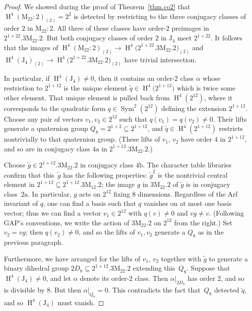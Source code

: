 \documentclass[pdftex]{sigma}
\numberwithin{equation}{section}
\newcommand\ra{\mathrm a}
\newcommand\rb{\mathrm b}
\newcommand\rJ{\mathrm J}
\newcommand\rM{\mathrm M}
\DeclareMathOperator\homology{H}
\renewcommand\H{\homology}
\newcommand\<\langle
\renewcommand\>\rangle
\DeclareMathOperator\Sym{Sym}
\begin{document}
\begin{proof}
 We showed during the proof of Theorem~\ref{thm.co2} that $\H^4(\rM_{22}:2)_{(2)} = 2^2$ is detected by restricting to the three conjugacy classes of order $2$ in $\rM_{22}:2$. All three of these classes have order-$2$ preimages in $2^{1+22}.3\rM_{22}.2$. But both conjugacy classes of order $2$ in $\rJ_4$ meet $2^{1+22}$. It follows that the images of $\H^4(\rM_{22}:2)_{(2)} \to \H^4\big(2^{1+22}.3\rM_{22}.2\big)_{(2)}$ and $\H^4(\rJ_4)_{(2)} \to \H^4\big(2^{1+22}.3\rM_{22}.2\big)_{(2)}$ have trivial intersection.

In particular, if $\H^4(\rJ_4) \neq 0$, then it contains an order-$2$ class $\alpha$ whose restriction to $2^{1+12}$ is the unique element $\tilde q \in \H^4\big(2^{1+12}\big)$ which is twice some other element. That unique element is pulled back from $\H^4(2^{12})$, where it corresponds to the quadratic form $q \in \Sym^2(2^{12})$ defining the extension $2^{1+12}$. Choose any pair of vectors $v_1,v_2 \in 2^{12}$ such that $q(v_1) = q(v_2) \neq 0$. Their lifts generate a quaternion group $Q_8 = 2^{1+2} \subseteq 2^{1+12}$, and $\tilde q \in \H^4(2^{1+12})$ restricts nontrivially to that quaternion group. (These lifts of $v_1$, $v_2$ have order $4$ in $2^{1+12}$, and so are in conjugacy class $4\ra$ in $2^{1+12}.3\rM_{22}.2$.)

Choose $\tilde g \in 2^{1+12}.3\rM_{22}.2$ in conjugacy class $4\rb$. The character table libraries confirm that this~$\tilde g$ has the following properties: $\tilde g^2$ is the nontrivial central element in $2^{1+12} \subseteq 2^{1+12}.3\rM_{12}.2$; the image $g$ in $3\rM_{22}.2$ of $\tilde g$ is in conjugacy class~$2\ra$. In particular, $g$ acts on $2^{12}$ fixing $8$ dimensions. Regardless of the Arf invariant of $q$, one can find a basis such that $q$ vanishes on at most one basis vector; thus we can find a vector $v_1 \in 2^{12}$ with $q(v) \neq 0$ and $vg \neq v$. (Following GAP's conventions, we write the action of $3\rM_{22}.2$ on $2^{12}$ from the right.) Set $v_2 = vg$; then $q(v_2) \neq 0$, and so the lifts of $v_1,v_2$ generate a $Q_8$ as in the previous paragraph.

Furthermore, we have arranged for the lifts of $v_1$, $v_2$ together with $\tilde g$ to generate a binary dihedral group $2D_8 \subseteq 2^{1+12}.3\rM_{22}.2$ extending this~$Q_8$. Suppose that $\H^4(\rJ_4) \neq 0$, and let $\alpha$ denote its order-$2$ class. Then $\alpha|_{2D_8}$ has order $2$, and so is divisible by $8$. But then $\alpha|_{Q_8} = 0$. This contradicts the fact that~$Q_8$ detected $\tilde q$, and so $\H^4(\rJ_4)$ must vanish.
 \end{proof}
\end{document}
